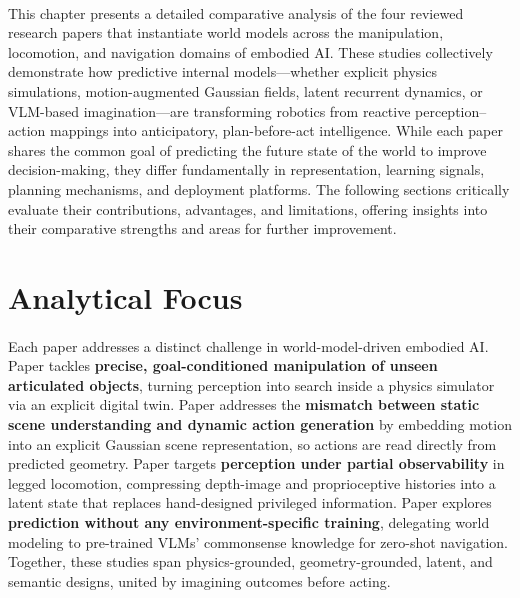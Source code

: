 \documentclass[12pt,a4paper,final]{extreport}
\begin{document}
\paragraph{}
This chapter presents a detailed comparative analysis of the four reviewed research papers that instantiate world models across the manipulation, locomotion, and navigation domains of embodied AI. These studies collectively demonstrate how predictive internal models---whether explicit physics simulations, motion-augmented Gaussian fields, latent recurrent dynamics, or VLM-based imagination---are transforming robotics from reactive perception--action mappings into anticipatory, plan-before-act intelligence. While each paper shares the common goal of predicting the future state of the world to improve decision-making, they differ fundamentally in representation, learning signals, planning mechanisms, and deployment platforms. The following sections critically evaluate their contributions, advantages, and limitations, offering insights into their comparative strengths and areas for further improvement.

\section{Analytical Focus}

\paragraph{} Each paper addresses a distinct challenge in world-model-driven embodied AI. Paper \cite{p1} tackles \textbf{precise, goal-conditioned manipulation of unseen articulated objects}, turning perception into search inside a physics simulator via an explicit digital twin. Paper \cite{p2} addresses the \textbf{mismatch between static scene understanding and dynamic action generation} by embedding motion into an explicit Gaussian scene representation, so actions are read directly from predicted geometry. Paper \cite{p3} targets \textbf{perception under partial observability} in legged locomotion, compressing depth-image and proprioceptive histories into a latent state that replaces hand-designed privileged information. Paper \cite{p4} explores \textbf{prediction without any environment-specific training}, delegating world modeling to pre-trained VLMs' commonsense knowledge for zero-shot navigation.
Together, these studies span physics-grounded, geometry-grounded, latent, and semantic designs, united by imagining outcomes before acting.
\end{document}
